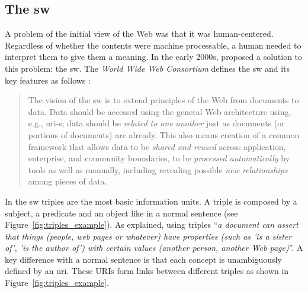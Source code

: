 \subsection{The \acl{sw}}
\label{sec:soa_sw}

A problem of the initial view of the Web was that it was human-centered.
Regardless of whether the contents were machine processable, a human needed to interpret them to give them a meaning.
In the early 2000s, \citet{berners-lee_semantic_2001} proposed a solution to this problem: the \acf{sw}.
The \emph{World Wide Web Consortium} defines the \ac{sw} and its key features as follows \citep{semanticWeb-FAQ}:
\begin{quote}
The vision of the \acl{sw} is to extend principles of the Web from documents to data.
Data should be accessed using the general Web architecture using, e.g., \acs{uri}-s;
data should be \emph{related to one another} just as documents (or portions of documents) are already.
This also means creation of a common framework that allows data to be \emph{shared and reused} across application, enterprise, and community boundaries,
to be \emph{processed automatically} by tools as well as manually, including revealing possible \emph{new relationships} among pieces of data.
\end{quote}


In the \ac{sw} triples are the most basic information units.
A triple is composed by a subject, a predicate and an object like in a normal sentence (see Figure~\ref{fig:triples_example}).
As \citeauthor{berners-lee_semantic_2001} explained, using triples ``\emph{a document can assert that things (people, web pages or whatever) have properties (such as 'is a sister of', 'is the author of') with certain values (another person, another Web page)}''.
A key difference with a normal sentence is that each concept is unambiguously defined by an \acs{uri}.
These URIs form links between different triples as shown in Figure~\ref{fig:triples_example}.


